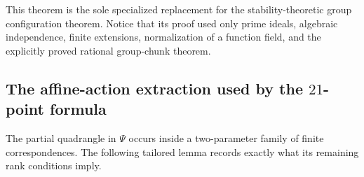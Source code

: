 \documentclass[11pt,oneside]{article}
\theoremstyle{definition}
\theoremstyle{remark}
\begin{document}
This theorem is the sole specialized replacement for the stability-theoretic group
configuration theorem.  Notice that its proof used only prime ideals, algebraic
independence, finite extensions, normalization of a function field, and the explicitly
proved rational group-chunk theorem.

\subsection[Affine-action extraction for the 21-point formula]
{The affine-action extraction used by the $21$-point formula}

The partial quadrangle in $\Psi$ occurs inside a two-parameter family of finite
correspondences.  The following tailored lemma records exactly what its remaining rank
conditions imply.
\end{document}
